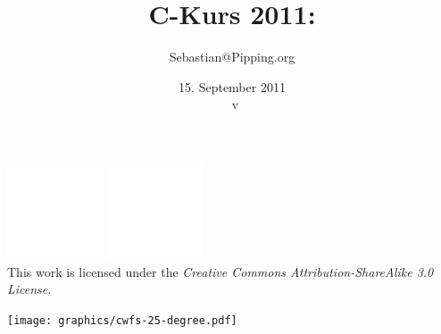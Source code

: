 \usepackage[utf8]{inputenc}
\usepackage[T1]{fontenc}
\usepackage[german]{babel} %
\usepackage{color}
\usepackage{textcomp}
\usepackage{ulem} %
\usepackage{pgf}

\title{C-Kurs 2011:\\
}
\author{Sebastian@Pipping.org}
\date{15. September 2011\\{\tiny~v\vspace*{-5ex}}}


\newcommand{\CcLongnameBySa}{Attribution-ShareAlike}
\newcommand{\CcImageBy}[1]{%
	\includegraphics[scale=#1]{creative-commons/cc-by-white.pdf}%
}
\newcommand{\CcImageSa}[1]{%
	\includegraphics[scale=#1]{creative-commons/cc-sa-white.pdf}%
}
\newcommand{\CcNote}[1]{%
	This work is licensed under the \textit{Creative Commons #1 3.0 License}.%
}
\newcommand{\CcGroupBySa}[2]{%
	\CcImageBy{#1}\hspace*{#2}\CcImageSa{#1}%
}



\pgfsetendarrow{\pgfarrowtriangle{4pt}}
\newcommand{\sexyarrowrightLarge}[0]{\pgfsetlinewidth{0.4pt}\pgfline{\pgfxy(0,0.15)}{\pgfxy(0.7,0.15)}\hspace*{3.35ex}}
\newcommand{\sexyarrowrightLARGE}[0]{\pgfsetlinewidth{0.6pt}\pgfline{\pgfxy(0,0.15)}{\pgfxy(0.9,0.15)}\hspace*{3.35ex}}


\newcommand{\citesrc}[1]{\textit{#1}}
\renewcommand{\emph}[1]{\textit{#1}}



\begin{frame}
	\titlepage
	\vfill
	\begin{center}
		\CcGroupBySa{0.33}{0.95ex}\\[2.5ex]
		{\tiny\CcNote{\CcLongnameBySa}}
		\vspace*{13ex}
	\end{center}
	\vspace*{-5ex}
	\vspace*{-0.5\textheight}\hspace*{0.65\textwidth}\texttt{[image: graphics/cwfs-25-degree.pdf]}
\end{frame}



